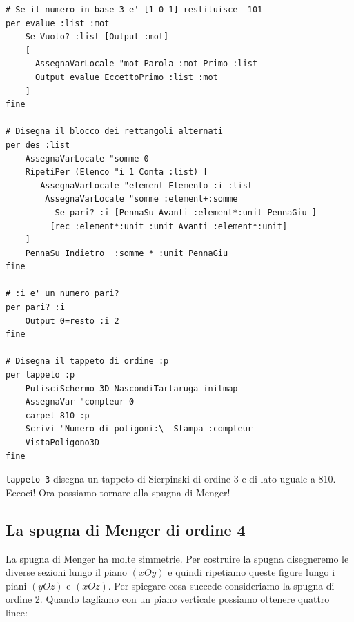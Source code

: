 \begin{lstlisting}[frame=single]
# Se il numero in base 3 e' [1 0 1] restituisce  101
per evalue :list :mot
	Se Vuoto? :list [Output :mot]
	[
	  AssegnaVarLocale "mot Parola :mot Primo :list
	  Output evalue EccettoPrimo :list :mot  
	]
fine
	
# Disegna il blocco dei rettangoli alternati
per des :list
	AssegnaVarLocale "somme 0
	RipetiPer (Elenco "i 1 Conta :list) [
	   AssegnaVarLocale "element Elemento :i :list
	    AssegnaVarLocale "somme :element+:somme 
		  Se pari? :i [PennaSu Avanti :element*:unit PennaGiu ]
		 [rec :element*:unit :unit Avanti :element*:unit]  
	]
	PennaSu Indietro  :somme * :unit PennaGiu
fine

# :i e' un numero pari?
per pari? :i
	Output 0=resto :i 2
fine

# Disegna il tappeto di ordine :p
per tappeto :p
	PulisciSchermo 3D NascondiTartaruga initmap
	AssegnaVar "compteur 0
	carpet 810 :p
	Scrivi "Numero di poligoni:\  Stampa :compteur 
	VistaPoligono3D
fine
\end{lstlisting}

\texttt{tappeto 3} disegna un tappeto di Sierpinski di ordine 3 e di lato uguale a 810. Eccoci! Ora possiamo tornare alla spugna di Menger!


\subsection{La spugna di Menger di ordine 4}
La spugna di Menger ha molte simmetrie. Per costruire la spugna disegneremo le diverse sezioni lungo il piano $(xOy)$ e quindi ripetiamo queste figure lungo i piani $(yOz)$ e $(xOz)$. Per spiegare cosa succede consideriamo la spugna di ordine 2. Quando tagliamo con un piano verticale possiamo ottenere quattro linee:\\

